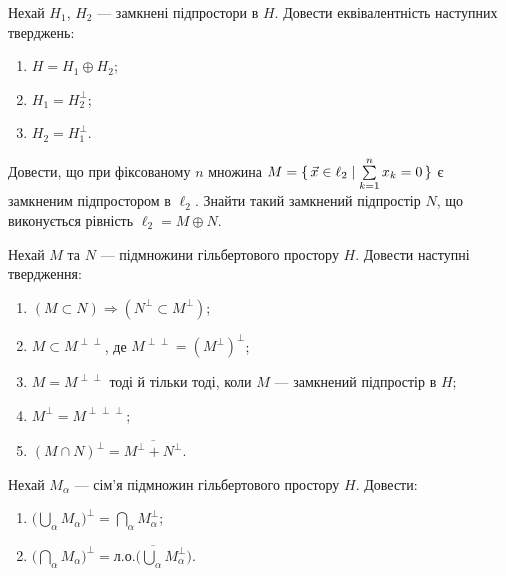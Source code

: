 
\begin{exercise}\label{N:1_2_16}
    Нехай $H_1$, $H_2$ --- замкнені підпростори в $H$.
    Довести еквівалентність наступних тверджень:
    \begin{enumerate}[label=\ukr*)]
        \item $H = H_1 \oplus H_2$;
        \item $H_1 = H_2^\perp $;
        \item $H_2 = H_1^\perp $.
    \end{enumerate}
\end{exercise}

\begin{exercise}
    Довести, що при фіксованому $n$ множина $M = \set{ \vec{x} \in \ell_2
    \mid \sum\limits^n_{k=1} x_k=0 }$ є замкненим підпростором в $\ell_2$.
    Знайти такий замкнений підпростір $N$, що виконується рівність $\ell_2 = M \oplus N$.
\end{exercise}

\begin{exercise}\label{N:1_2_18}
    Нехай $M$ та $N$ --- підмножини гільбертового простору $H$. Довести наступні твердження:
    \begin{enumerate}[label=\ukr*)]
        \item $(M \subset N) \Rightarrow (N^\perp \subset M^\perp)$;
        \item $M \subset M^{\perp\perp}$, де $M^{\perp\perp}={(M^\perp)}^\perp$;
        \item $M = M^{\perp\perp}$ тоді й тільки тоді, коли $M$ ---
              замкнений підпростір в $H$;
        \item $M^\perp = M^{\perp\perp\perp}$;
        \item $(M \cap N)^\perp = \overline{M^\perp + N^\perp}$.
    \end{enumerate}
\end{exercise}

\begin{exercise}
    Нехай $M_\alpha$ --- сім'я підмножин гільбертового простору $H$. Довести:
    \begin{enumerate}[label=\ukr*)]
        \item $\Big( \bigcup\limits_\alpha M_\alpha \Big)^\perp = 
              \bigcap\limits_\alpha M_\alpha^\perp$;
        \item $\Big( \bigcap\limits_\alpha M_\alpha \Big)^\perp = 
              \overline{\text{л.о.}\Big(\bigcup\limits_\alpha M_\alpha^\perp\Big)}$.
    \end{enumerate}
\end{exercise}

